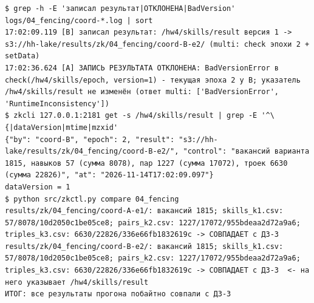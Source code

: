 \begin{Verbatim}
$ grep -h -E 'записал результат|ОТКЛОНЕНА|BadVersion' logs/04_fencing/coord-*.log | sort
17:02:09.119 [B] записал результат: /hw4/skills/result версия 1 -> s3://hh-lake/results/zk/04_fencing/coord-B-e2/ (multi: check эпохи 2 + setData)
17:02:36.624 [A] ЗАПИСЬ РЕЗУЛЬТАТА ОТКЛОНЕНА: BadVersionError в check(/hw4/skills/epoch, version=1) - текущая эпоха 2 у B; указатель /hw4/skills/result не изменён (ответ multi: ['BadVersionError', 'RuntimeInconsistency'])
$ zkcli 127.0.0.1:2181 get -s /hw4/skills/result | grep -E '^\{|dataVersion|mtime|mzxid'
{"by": "coord-B", "epoch": 2, "result": "s3://hh-lake/results/zk/04_fencing/coord-B-e2/", "control": "вакансий варианта 1815, навыков 57 (сумма 8078), пар 1227 (сумма 17072), троек 6630 (сумма 22826)", "at": "2026-11-14T17:02:09.097"}
dataVersion = 1
$ python src/zkctl.py compare 04_fencing
results/zk/04_fencing/coord-A-e1/: вакансий 1815; skills_k1.csv: 57/8078/10d2050c1be05ce8; pairs_k2.csv: 1227/17072/955bdeaa2d72a9a6; triples_k3.csv: 6630/22826/336e66fb1832619c -> СОВПАДАЕТ с ДЗ-3
results/zk/04_fencing/coord-B-e2/: вакансий 1815; skills_k1.csv: 57/8078/10d2050c1be05ce8; pairs_k2.csv: 1227/17072/955bdeaa2d72a9a6; triples_k3.csv: 6630/22826/336e66fb1832619c -> СОВПАДАЕТ с ДЗ-3  <- на него указывает /hw4/skills/result
ИТОГ: все результаты прогона побайтно совпали с ДЗ-3
\end{Verbatim}
